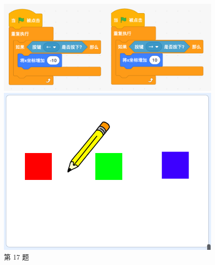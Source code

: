\documentclass[10pt, a4paper]{article}
\begin{document}
\begin{enumerate}
        \begin{figure}[htbp]
            \centering
            \begin{minipage}[t]{.35\textwidth}
                \centering
                \includegraphics[width=\textwidth]{17.png}
                \caption*{第 17 题}
            \end{minipage}
            \begin{minipage}[t]{.6\textwidth}
                \begin{minipage}[t]{.3\textwidth}
                    \centering
                    \includegraphics[width=\textwidth]{18-1.png}
                \end{minipage}
                \begin{minipage}[t]{.36\textwidth}
                    \centering

\end{minipage}
\end{minipage}
\end{figure}
\end{enumerate}
\end{document}
